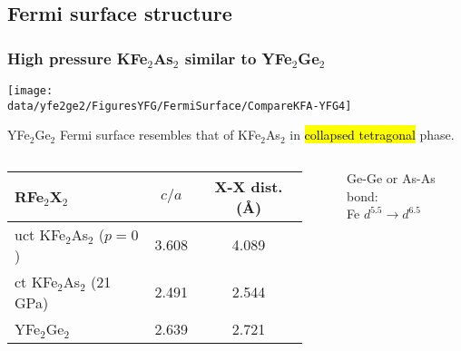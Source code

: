 \subsection{Fermi surface structure}
\begin{frame}[label=CollapsedTetragonala]
\frametitle{High pressure KFe$_2$As$_2$ similar to YFe$_2$Ge$_2$}

\centerline{\texttt{[image: \\data/yfe2ge2/FiguresYFG/FermiSurface/CompareKFA-YFG4]}}

\begin{center}
YFe$_2$Ge$_2$ Fermi surface resembles that of
  KFe$_2$As$_2$ in \hl{collapsed tetragonal} phase.
\end{center}
\vspace{-2em}
{\small 
\begin{columns}[c]
\begin{center}
\begin{tabular}{l|c|c}
RFe$_2$X$_2$ & \multicolumn{1}{c|}{$c/a$} &\multicolumn{1}{c}{X-X dist. (\AA)} \\
\hline
uct KFe$_2$As$_2$ ($p = 0$) & 3.608 & 4.089  \\
ct KFe$_2$As$_2$ (21 GPa) &  2.491 & 2.544 \\
YFe$_2$Ge$_2$ & 2.639 & 2.721 \\
\hline
\end{tabular}
\end{center}

~\vspace{2em}
\begin{center}
Ge-Ge or As-As bond: \\
Fe $d^{5.5} \rightarrow d^{6.5}$
\end{center}
\end{columns}
}
\end{frame}


